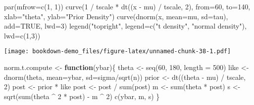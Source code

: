 \documentclass[
]{book}
\newenvironment{Shaded}{\begin{snugshade}}{\end{snugshade}}
\newcommand{\AttributeTok}[1]{\textcolor[rgb]{0.77,0.63,0.00}{#1}}
\newcommand{\ConstantTok}[1]{\textcolor[rgb]{0.00,0.00,0.00}{#1}}
\newcommand{\ControlFlowTok}[1]{\textcolor[rgb]{0.13,0.29,0.53}{\textbf{#1}}}
\newcommand{\DecValTok}[1]{\textcolor[rgb]{0.00,0.00,0.81}{#1}}
\newcommand{\FunctionTok}[1]{\textcolor[rgb]{0.00,0.00,0.00}{#1}}
\newcommand{\NormalTok}[1]{#1}
\newcommand{\OtherTok}[1]{\textcolor[rgb]{0.56,0.35,0.01}{#1}}
\newcommand{\SpecialCharTok}[1]{\textcolor[rgb]{0.00,0.00,0.00}{#1}}
\newcommand{\StringTok}[1]{\textcolor[rgb]{0.31,0.60,0.02}{#1}}
\begin{document}
\begin{Shaded}
\begin{Highlighting}[]
\FunctionTok{par}\NormalTok{(}\AttributeTok{mfrow=}\FunctionTok{c}\NormalTok{(}\DecValTok{1}\NormalTok{, }\DecValTok{1}\NormalTok{))}
\FunctionTok{curve}\NormalTok{(}\DecValTok{1} \SpecialCharTok{/}\NormalTok{ tscale }\SpecialCharTok{*} \FunctionTok{dt}\NormalTok{((x }\SpecialCharTok{{-}}\NormalTok{ mu) }\SpecialCharTok{/}\NormalTok{ tscale, }\DecValTok{2}\NormalTok{),}
   \AttributeTok{from=}\DecValTok{60}\NormalTok{, }\AttributeTok{to=}\DecValTok{140}\NormalTok{, }\AttributeTok{xlab=}\StringTok{"theta"}\NormalTok{, }
   \AttributeTok{ylab=}\StringTok{"Prior Density"}\NormalTok{)}
\FunctionTok{curve}\NormalTok{(}\FunctionTok{dnorm}\NormalTok{(x, }\AttributeTok{mean=}\NormalTok{mu, }\AttributeTok{sd=}\NormalTok{tau), }\AttributeTok{add=}\ConstantTok{TRUE}\NormalTok{, }\AttributeTok{lwd=}\DecValTok{3}\NormalTok{)}
\FunctionTok{legend}\NormalTok{(}\StringTok{"topright"}\NormalTok{, }\AttributeTok{legend=}\FunctionTok{c}\NormalTok{(}\StringTok{"t density"}\NormalTok{,}
                            \StringTok{"normal density"}\NormalTok{),}
       \AttributeTok{lwd=}\FunctionTok{c}\NormalTok{(}\DecValTok{1}\NormalTok{,}\DecValTok{3}\NormalTok{))}
\end{Highlighting}
\end{Shaded}

\texttt{[image: bookdown-demo\_files/figure-latex/unnamed-chunk-38-1.pdf]}

\begin{Shaded}
\begin{Highlighting}[]
\NormalTok{norm.t.compute }\OtherTok{\textless{}{-}} \ControlFlowTok{function}\NormalTok{(ybar)\{}
\NormalTok{     theta }\OtherTok{\textless{}{-}} \FunctionTok{seq}\NormalTok{(}\DecValTok{60}\NormalTok{, }\DecValTok{180}\NormalTok{, }\AttributeTok{length =} \DecValTok{500}\NormalTok{)}
\NormalTok{     like }\OtherTok{\textless{}{-}} \FunctionTok{dnorm}\NormalTok{(theta, }\AttributeTok{mean=}\NormalTok{ybar,}
                   \AttributeTok{sd=}\NormalTok{sigma}\SpecialCharTok{/}\FunctionTok{sqrt}\NormalTok{(n))}
\NormalTok{     prior }\OtherTok{\textless{}{-}} \FunctionTok{dt}\NormalTok{((theta }\SpecialCharTok{{-}}\NormalTok{ mu) }\SpecialCharTok{/}\NormalTok{ tscale, }\DecValTok{2}\NormalTok{)}
\NormalTok{     post }\OtherTok{\textless{}{-}}\NormalTok{ prior }\SpecialCharTok{*}\NormalTok{ like}
\NormalTok{     post }\OtherTok{\textless{}{-}}\NormalTok{ post }\SpecialCharTok{/} \FunctionTok{sum}\NormalTok{(post)}
\NormalTok{     m }\OtherTok{\textless{}{-}} \FunctionTok{sum}\NormalTok{(theta }\SpecialCharTok{*}\NormalTok{ post)}
\NormalTok{     s }\OtherTok{\textless{}{-}} \FunctionTok{sqrt}\NormalTok{(}\FunctionTok{sum}\NormalTok{(theta }\SpecialCharTok{\^{}} \DecValTok{2} \SpecialCharTok{*}\NormalTok{ post) }\SpecialCharTok{{-}}\NormalTok{ m }\SpecialCharTok{\^{}} \DecValTok{2}\NormalTok{)}
     \FunctionTok{c}\NormalTok{(ybar, m, s) }
\NormalTok{\}}
\end{Highlighting}
\end{Shaded}
\end{document}
